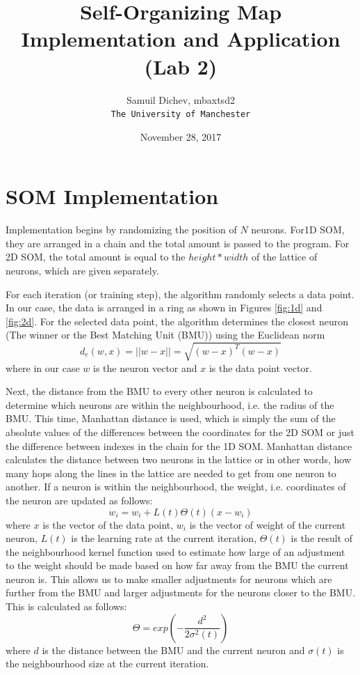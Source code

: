 \documentclass[a4paper,11pt,twocolumn]{article}
\title{Self-Organizing Map Implementation and Application (Lab 2)}
\date{November 28, 2017}
\author{
  Samuil Dichev, mbaxtsd2\\
  \texttt{The University of Manchester}\\
}
\begin{document}
\maketitle

\section{SOM Implementation}
Implementation begins by randomizing the position of $N$ neurons. For1D SOM, they are arranged in a chain and the total amount is passed to the program. For 2D SOM, the total amount is equal to the $height * width$ of the lattice of neurons, which are given separately.

For each iteration (or training step), the algorithm randomly selects a data point. In our case, the data is arranged in a ring as shown in Figures \ref{fig:1d} and \ref{fig:2d}. For the selected data point, the algorithm determines the closest neuron (The winner or the Best Matching Unit (BMU)) using the Euclidean norm \[d_e(w,x) = ||w - x|| = \sqrt{(w - x)^T(w-x)}\] where in our case $w$ is the neuron vector and $x$ is the data point vector.

Next, the distance from the BMU to every other neuron is calculated to determine which neurons are within the neighbourhood, i.e. the radius of the BMU. This time, Manhattan distance is used, which is simply the sum of the absolute values of the differences between the coordinates for the 2D SOM or just the difference between indexes in the chain for the 1D SOM. Manhattan distance calculates the distance between two neurons in the lattice or in other words, how many hops along the lines in the lattice are needed to get from one neuron to another.
If a neuron is within the neighbourhood, the weight, i.e. coordinates of the neuron are updated as follows: \[w_i = w_i + L(t)\Theta(t)(x - w_i) \] where $x$ is the vector of the data point, $w_i$ is the vector of weight of the current neuron, $L(t)$ is the learning rate at the current iteration, $\Theta(t)$ is the result of the neighbourhood kernel function used to estimate how large of an adjustment to the weight should be made based on how far away from the BMU the current neuron is. This allows us to make smaller adjustments for neurons which are further from the BMU and larger adjustments for the neurons closer to the BMU. This is calculated as follows: \[\Theta = exp(-\frac{d^2}{2\sigma^2(t)}) \] where $d$ is the distance between the BMU and the current neuron and $\sigma(t)$ is the neighbourhood size at the current iteration. 
\end{document}
